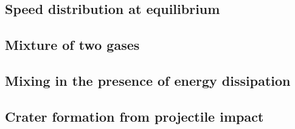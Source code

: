 \subsection{Speed distribution at equilibrium}\label{sec:eq}



\subsection{Mixture of two gases}\label{sec:mix1}



\subsection{Mixing in the presence of energy dissipation}\label{sec:mix2}



\subsection{Crater formation from projectile impact}\label{sec:crater}






